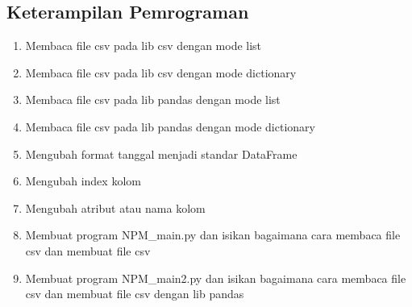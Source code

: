 \subsection{Keterampilan Pemrograman}
\begin{enumerate}
	\item Membaca file csv pada lib csv dengan mode list

		

	\item Membaca file csv pada lib csv dengan mode dictionary

		

	\item Membaca file csv pada lib pandas dengan mode list
		
		

	\item Membaca file csv pada lib pandas dengan mode dictionary

		

	\item Mengubah format tanggal menjadi standar DataFrame

		
	
	\item Mengubah index kolom

		

	\item Mengubah atribut atau nama kolom

		

	\item Membuat program NPM\_main.py dan isikan bagaimana cara membaca file csv dan membuat file csv

		
	
	\item Membuat program NPM\_main2.py dan isikan bagaimana cara membaca file csv dan membuat file csv dengan lib pandas

		
	

\end{enumerate}

